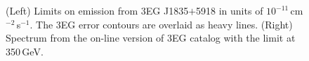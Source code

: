 \begin{figure}[t]
\caption{\label{FIG::OBSERVATIONS::J1835} (Left) Limits on emission from 
3EG J1835$+$5918 in units of $10^{-11}$\,cm$^{-2}$\,s$^{-1}$. The 3EG
error contours are overlaid as heavy lines. (Right) Spectrum from
the on-line version of 3EG catalog with the limit at 350\,GeV.}
\end{figure}

